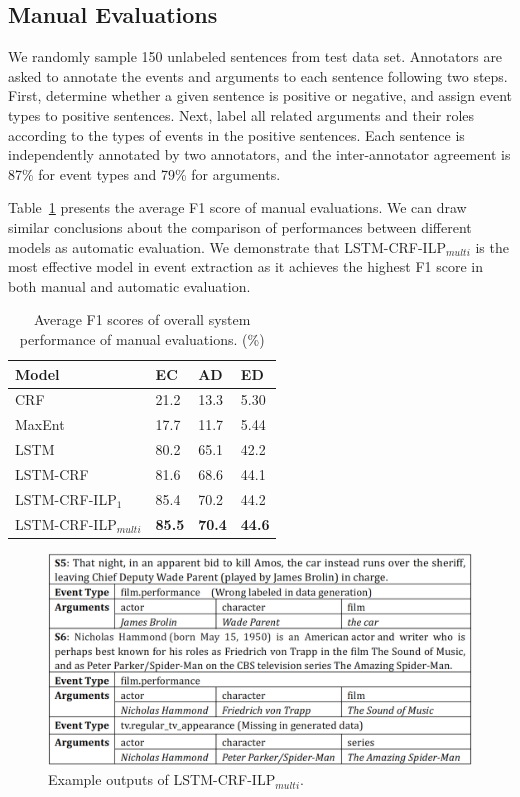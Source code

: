 \documentclass{article}
\begin{document}
\subsection{Manual Evaluations}
We randomly sample 150 unlabeled sentences from test data set. Annotators are asked to annotate the events and arguments to each sentence following two steps. First, determine whether a given sentence is positive or negative, and assign event types to positive sentences. Next, label all related arguments and their roles according to the types of events in the positive sentences. Each sentence is independently annotated by two annotators, and the inter-annotator agreement is 87\% for event types and 79\% for arguments.

Table~\ref{tab:2} presents the average F1 score of manual evaluations. We can draw similar conclusions about the comparison of performances between different models as automatic evaluation. We demonstrate that LSTM-CRF-ILP$_{multi}$ is the most effective model in event extraction as it achieves the highest F1 score in both manual and automatic evaluation.

\begin{table}[h]
\small
\centering
\begin{tabular}{|l|p{0.8cm}<{\centering}|p{0.8cm}<{\centering}|p{0.8cm}<{\centering}|} \hline
	Model & EC & AD & ED \\ \hline
	CRF & 21.2 & 13.3 & 5.30 \\ \hline
	MaxEnt & 17.7 & 11.7 & 5.44 \\ \hline
	LSTM & 80.2 & 65.1 & 42.2 \\ \hline \hline
	LSTM-CRF & 81.6 & 68.6 & 44.1 \\ \hline
	LSTM-CRF-ILP$_{1}$ & 85.4 & 70.2 & 44.2 \\ \hline
	LSTM-CRF-ILP$_{multi}$ & \textbf{85.5} & \textbf{70.4} & \textbf{44.6} \\ \hline
\end{tabular}
\caption{Average F1 scores of overall system performance of manual evaluations. (\%) \label{tab:2}}
\end{table}

\begin{figure}[h]
	\centering
	\includegraphics[width=.48\textwidth]{example.png}
	\caption{Example outputs of LSTM-CRF-ILP$_{multi}$.\label{fig:1}}
\end{figure}
\end{document}
